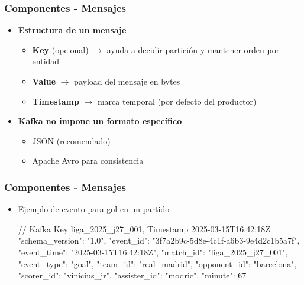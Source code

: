 \documentclass[aspectratio=169]{beamer}
\begin{document}
\begin{frame}[fragile]\frametitle{Componentes - Mensajes}
\begin{itemize}
  \item \textbf{Estructura de un mensaje}
  \begin{itemize}
    \item \textbf{Key} (opcional) $\rightarrow$ ayuda a decidir partición y mantener orden por entidad
    \item \textbf{Value} $\rightarrow$ payload del mensaje en bytes
    \item \textbf{Timestamp} $\rightarrow$ marca temporal (por defecto del productor)
  \end{itemize}

  \vspace{1em}

  \item \textbf{Kafka no impone un formato específico}
  \begin{itemize}
    \item JSON (recomendado)
    \item Apache Avro para consistencia
  \end{itemize}
\end{itemize}
\end{frame}



\begin{frame}[fragile]\frametitle{Componentes - Mensajes}
\begin{itemize}
  \item Ejemplo de evento para gol en un partido
  \begin{shcode}
    // Kafka Key liga_2025_j27_001, Timestamp 2025-03-15T16:42:18Z
    {
      "schema_version": "1.0",
      "event_id": "3f7a2b9c-5d8e-4c1f-a6b3-9e4d2c1b5a7f",
      "event_time": "2025-03-15T16:42:18Z",
      "match_id": "liga_2025_j27_001",
      "event_type": "goal",
      "team_id": "real_madrid",
      "opponent_id": "barcelona",
      "scorer_id": "vinicius_jr",
      "assister_id": "modric",
      "minute": 67
    }
  \end{shcode}
\end{itemize}
\end{frame}
\end{document}

